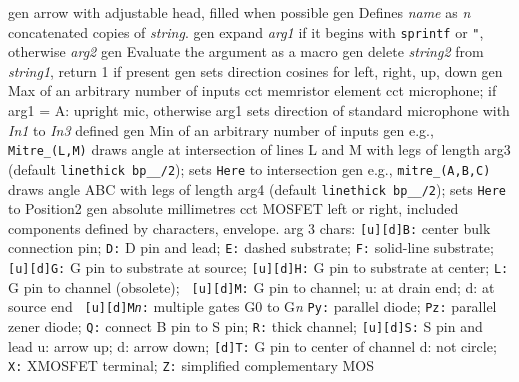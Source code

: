 %
  {gen}
  {arrow with adjustable head, filled when possible}
  {gen}
  {Defines {\sl name} as {\sl n} concatenated copies of {\sl
  string}.}
  {gen}
  {expand {\sl arg1} if it begins
    with {\tt sprintf} or {\tt "}, otherwise {\sl arg2}}
  {gen}
  {Evaluate the argument as a macro}
  {gen}
  {delete {\sl string2} from {\sl string1}, return 1 if present}
  {gen}
  {sets direction cosines for left, right, up, down}
  {gen}
  {Max of an arbitrary number of inputs}
  {cct}
  {memristor element}
  {cct}
  {microphone; if arg1 = A: upright mic, otherwise arg1 sets
  direction
   of standard microphone with {\sl In1} to {\sl In3} defined
   }
  {gen}
  {Min of an arbitrary number of inputs}
  {gen}
  {e.g., {\tt Mitre\_(L,M)} draws angle at intersection of lines
   L and M with legs of length arg3 (default {\tt linethick bp\_\_/2});
   sets {\tt Here} to intersection
    }
  {gen}
  {e.g., {\tt mitre\_(A,B,C)} draws angle ABC with legs
   of length arg4 (default {\tt linethick bp\_\_/2}); sets {\tt Here}
   to Position2
    }
  {gen}
  {absolute millimetres}
  {cct}
  {MOSFET left or right, included components defined by characters,
  envelope.
   arg 3 chars:
      {\tt [u][d]B:} center bulk connection pin; {\tt D:} D pin and lead;
      {\tt E:} dashed substrate; {\tt F:} solid-line substrate; {\tt
      [u][d]G:} G pin to substrate at source; {\tt [u][d]H:} G pin to
      substrate at center; {\tt L:} G pin to channel (obsolete); {\tt
      [u][d]M:} G pin to channel; u: at drain end; d: at source end {\tt
      [u][d]M{\sl n}:} multiple gates G0 to G{\sl n} {\tt Py:} parallel
      diode; {\tt Pz:} parallel zener diode; {\tt Q:} connect B pin to
      S pin; {\tt R:} thick channel; {\tt [u][d]S:} S pin and lead u:
      arrow up; d: arrow down; {\tt [d]T:} G pin to center of channel
      d: not circle; {\tt X:} XMOSFET terminal; {\tt Z:} simplified
      complementary MOS
    }
